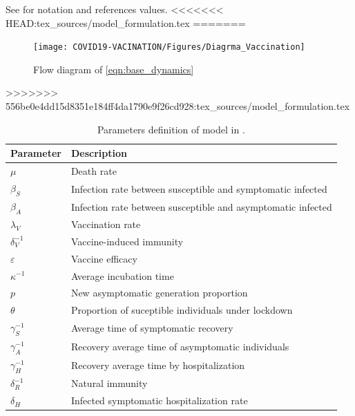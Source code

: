      See  for notation and references
     values.
<<<<<<< HEAD:tex_sources/model_formulation.tex
=======
     \begin{figure}[tbh]
    \centering
      \texttt{[image: COVID19-VACINATION/Figures/Diagrma\_Vaccination]}
    \caption{Flow diagram of \cref{eqn:base_dynamics}}
    \label{fig:Flowdiagram}
\end{figure}
>>>>>>> 556be0e4dd15d8351e184ff4da1790e9f26cd928:tex_sources/model_formulation.tex
\begin{table}[h!]
	\centering
	\begin{tabular}{>{\centering}%
        p{}%
        p{}
    }
    \toprule
		\textbf{Parameter} & \textbf{Description}
  	\\
  	\midrule
		$\mu$ &
			Death rate
		\\
        $\beta_S$ &
        	Infection rate between susceptible and symptomatic infected
		\\
        $\beta_A$ &
        	Infection rate between susceptible and asymptomatic infected
		\\
        $\lambda_V$ &
        	Vaccination rate
		\\
        $\delta_{V}^{-1}$ &
        Vaccine-induced immunity
		\\
        $\varepsilon$ &
        	Vaccine efficacy
		\\
        $\kappa^{-1}$ &
        	Average incubation time
        \\
		$p$ &
			New asymptomatic generation proportion
		\\
	    $\theta$ &
        	Proportion of suceptible individuals under lockdown
        \\
        $\gamma_{S}^{-1}$ &
        	Average time of symptomatic recovery
        \\
		$\gamma_{A}^{-1}$ &
			Recovery average time of asymptomatic individuals
		\\
		$\gamma_{H}^{-1}$ &
			Recovery average time by hospitalization
		\\
        $\delta_{R}^{-1}$ &
        	Natural immunity
  		\\
  		$\delta_{H}$ &
        	Infected symptomatic hospitalization rate
  		\\
  	\bottomrule
	\end{tabular}
		\caption{
			Parameters definition of model in
			.}
    \label{tbl:dynamics_base_parameters}
\end{table}
